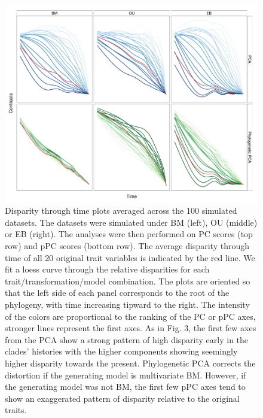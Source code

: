 \documentclass[12pt,twoside]{article}
\begin{document}
\begin{figure}[p]
\centering
\includegraphics[scale=0.65]{./fig/dtt-2panel.pdf}
\caption[Disparity through time plots]{Disparity through time plots averaged across the 100 simulated datasets. The datasets were simulated under BM (left), OU (middle) or EB (right). The analyses were then performed on PC scores (top row) and pPC scores (bottom row). The average disparity through time of all 20 original trait variables is indicated by the red line. We fit a loess curve through the relative disparities for each trait/transformation/model combination. The plots are oriented so that the left side of each panel corresponds to the root of the phylogeny, with time increasing tipward to the right. The intensity of the colors are proportional to the ranking of the PC or pPC axes, stronger lines represent the first axes. As in Fig. 3, the first few axes from the PCA show a strong pattern of high disparity early in the clades' histories with the higher components showing seemingly higher disparity towards the present. Phylogenetic PCA corrects the distortion if the generating model is multivariate BM. However, if the generating model was not BM, the first few pPC axes tend to show an exaggerated pattern of disparity relative to the original traits.}
\label{dttplot}
\end{figure}
\end{document}

